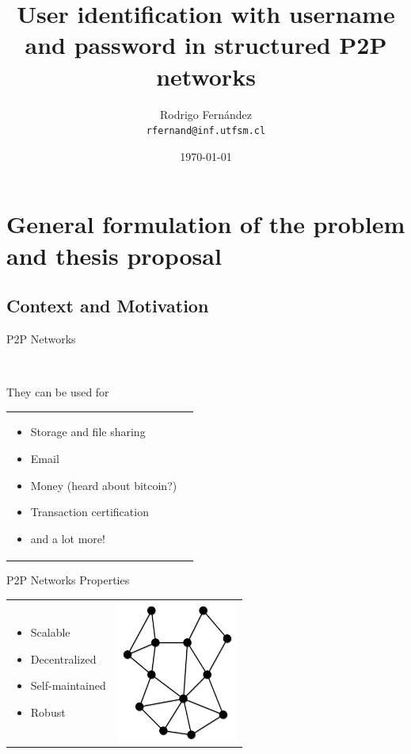 \documentclass[12pt]{beamer}
\title{User identification with username and password in structured P2P networks}
\subtitle{}
\author[R. Fernández]{Rodrigo Fernández \\ \small{\texttt{rfernand@inf.utfsm.cl}}}
\institute[]{Universidad Técnica Federico Santa María}
\date{\today}
\renewcommand{\frametitle}[1]{\vspace{0.2cm}\begin{huge}#1\end{huge}}
\renewcommand{\framesubtitle}[1]{\\ \vspace{0.4cm} \hspace{0.4cm}\begin{large}#1\end{large}}
\begin{document}
  

  \frame{\titlepage}
  \frame{\tableofcontents}

  \section{General formulation of the problem and thesis proposal}
  \subsection{Context and Motivation}

  \begin{frame}
  \frametitle{P2P Networks}
  \framesubtitle{They can be used for}
  
  \begin{table}
  \begin{tabular}{p{7cm}p{3cm}}
  \begin{itemize}
    \item Storage and file sharing
    \item Email
    \item Money (heard about bitcoin?)
    \item Transaction certification
    \item and a lot more!
  \end{itemize}
  &
  \vspace{1.5cm}
  \end{tabular}
  \end{table}
  \end{frame}

    \begin{frame}
    \frametitle{P2P Networks Properties}
    \begin{table}
    \begin{tabular}{p{7cm}p{3cm}}
    \begin{itemize}
      \item Scalable
      \item Decentralized
      \item Self-maintained
      \item Robust
    \end{itemize}
    &
    \vspace{1.5cm}
    \includegraphics[width=4cm]{../../presentacion/img/p2p-unstructured}\\
    \end{tabular}
    \end{table}
    \end{frame}
    
\end{document}

